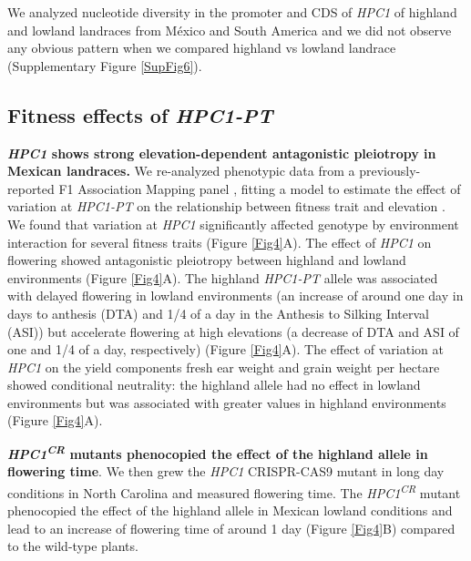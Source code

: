 \documentclass[9pt,twocolumn,twoside,lineno]{BioRxiv}
\begin{document}
We analyzed nucleotide diversity in the promoter and CDS of \textit{HPC1} of highland and lowland landraces from México and South America and we did not observe any obvious pattern  when we compared highland vs lowland landrace (Supplementary Figure \ref{SupFig6}).
\subsection{Fitness effects of \textit{HPC1-PT}}
\textbf{\textit{HPC1} shows strong elevation-dependent antagonistic pleiotropy in Mexican landraces.} 
We re-analyzed phenotypic data from a previously-reported F1 Association Mapping panel \cite{Romero_Navarro2017-cn} \cite{Gates2019-xu}, fitting a model to estimate the effect of variation at \textit{HPC1-PT} on the relationship between fitness trait and elevation \cite{Runcie2019-Gr}. 
We found that variation at \textit{HPC1} significantly affected genotype by environment interaction for several fitness traits (Figure \ref{Fig4}A). 
The effect of \textit{HPC1} on flowering showed antagonistic pleiotropy between highland and lowland environments (Figure \ref{Fig4}A). 
The highland \textit{HPC1-PT} allele was associated with delayed flowering in lowland environments (an increase of around one day in days to anthesis (DTA)  and 1/4 of a day in the  Anthesis to Silking Interval (ASI)) but accelerate flowering at high elevations (a decrease of DTA and ASI of one and 1/4 of a day, respectively) (Figure \ref{Fig4}A).
The effect of  variation at \textit{HPC1} on the yield components fresh ear weight and grain weight per hectare showed conditional neutrality: the highland allele had no effect in lowland environments but was associated with greater values in highland environments (Figure \ref{Fig4}A).

\textbf{\textit{HPC1\textsuperscript{CR}} mutants phenocopied the effect of the highland allele in flowering time}.
We then grew the \textit{HPC1} CRISPR-CAS9 mutant in long day conditions in North Carolina and measured flowering time. 
The \textit{HPC1\textsuperscript{CR}} mutant phenocopied the effect of the highland allele in Mexican lowland conditions and lead to an increase of flowering time of around 1 day (Figure \ref{Fig4}B) compared to the wild-type plants. 
\end{document}
